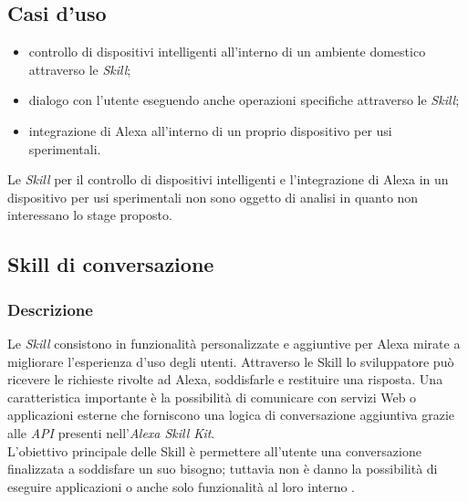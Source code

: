 	\subsection{Casi d'uso}
	\begin{itemize}
		\item controllo di dispositivi intelligenti all'interno di un ambiente domestico attraverso le \textit{Skill};
		\item dialogo con l'utente eseguendo anche operazioni specifiche attraverso le \textit{Skill};
		\item integrazione di Alexa all'interno di un proprio dispositivo per usi sperimentali.
	\end{itemize}
	Le \textit{Skill} per il controllo di dispositivi intelligenti e l'integrazione di Alexa in un dispositivo per usi sperimentali non sono oggetto di analisi in quanto non interessano lo stage proposto.
	\subsection{Skill di conversazione}
		\subsubsection{Descrizione}
		Le \textit{Skill} consistono in funzionalità personalizzate e aggiuntive per Alexa mirate a migliorare l'esperienza d'uso degli utenti. Attraverso le Skill lo sviluppatore può ricevere le richieste rivolte ad Alexa, soddisfarle e restituire una risposta. Una caratteristica importante è la possibilità di comunicare con servizi Web o applicazioni esterne che forniscono una logica di conversazione aggiuntiva grazie alle \textit{API} presenti nell'\textit{Alexa Skill Kit}. \\
		L'obiettivo principale delle Skill è permettere all'utente una conversazione finalizzata a soddisfare un suo bisogno; tuttavia non è danno la possibilità di eseguire applicazioni o anche solo funzionalità al loro interno .
